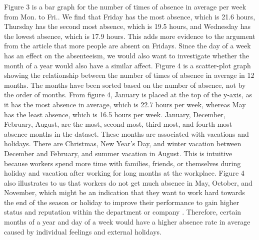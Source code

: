 \documentclass{article}
\begin{document}
Figure 3 is a bar graph for the number of times of absence in average per week from Mon. to Fri.. We find that Friday has the most absence, which is 21.6 hours, Thursday has the second most absence, which is 19.5 hours, and Wednesday has the lowest absence, which is 17.9 hours. This adds more evidence to the argument from the article that more people are absent on Fridays. Since the day of a week has an effect on the absenteeism, we would also want to investigate whether the month of a year would also have a similar affect. Figure 4 is a scatter-plot graph showing the relationship between the number of times of absence in average in 12 months. The months have been sorted based on the number of absence, not by the order of months. From figure 4, January is placed at the top of the y-axis, as it has the most absence in average, which is 22.7 hours per week, whereas May has the least absence, which is 16.5 hours per week. January, December, February, August, are the most, second most, third most, and fourth most absence months in the dataset. These months are associated with vacations and holidays. There are Christmas, New Year's Day, and winter vacation between December and February, and summer vacation in August. This is intuitive because workers spend more time with families, friends, or themselves during holiday and vacation after working for long months at the workplace. Figure 4 also illustrates to us that workers do not get much absence in May, October, and November, which might be an indication that they want to work hard towards the end of the season or holiday to improve their performance to gain higher status and reputation within the department or company \cite{maroney_2017}. Therefore, certain months of a year and day of a week would have a higher absence rate in average caused by individual feelings and external holidays. \\
\end{document}
